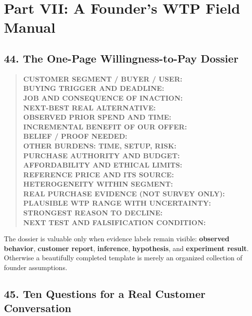 \section*{Part VII: A Founder's WTP Field Manual}

\subsection*{44. The One-Page Willingness-to-Pay Dossier}

\begin{quote}
\small
\textbf{CUSTOMER SEGMENT / BUYER / USER:}\\
\textbf{BUYING TRIGGER AND DEADLINE:}\\
\textbf{JOB AND CONSEQUENCE OF INACTION:}\\
\textbf{NEXT-BEST REAL ALTERNATIVE:}\\
\textbf{OBSERVED PRIOR SPEND AND TIME:}\\
\textbf{INCREMENTAL BENEFIT OF OUR OFFER:}\\
\textbf{BELIEF / PROOF NEEDED:}\\
\textbf{OTHER BURDENS: TIME, SETUP, RISK:}\\
\textbf{PURCHASE AUTHORITY AND BUDGET:}\\
\textbf{AFFORDABILITY AND ETHICAL LIMITS:}\\
\textbf{REFERENCE PRICE AND ITS SOURCE:}\\
\textbf{HETEROGENEITY WITHIN SEGMENT:}\\
\textbf{REAL PURCHASE EVIDENCE (NOT SURVEY ONLY):}\\
\textbf{PLAUSIBLE WTP RANGE WITH UNCERTAINTY:}\\
\textbf{STRONGEST REASON TO DECLINE:}\\
\textbf{NEXT TEST AND FALSIFICATION CONDITION:}
\end{quote}

The dossier is valuable only when evidence labels remain visible: \textbf{observed behavior}, \textbf{customer report}, \textbf{inference}, \textbf{hypothesis}, and \textbf{experiment result}. Otherwise a beautifully completed template is merely an organized collection of founder assumptions.

\subsection*{45. Ten Questions for a Real Customer Conversation}

